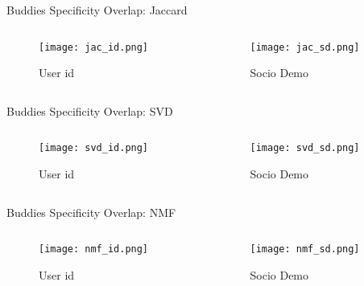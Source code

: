 \documentclass[pdf]{beamer}
\begin{document}
\begin{frame}{Buddies Specificity Overlap: Jaccard}
     \begin{columns}[T] %
     \begin{column}[T]{5cm} %
              \begin{figure}
     \texttt{[image: jac\_id.png]}
     \caption{User id}
              \end{figure}
     \end{column}
          \begin{column}[T]{5cm} %
          \begin{figure}
     \texttt{[image: jac\_sd.png]}
          \caption{Socio Demo}
              \end{figure}
    	\end{column}
     \end{columns}
\end{frame}

\begin{frame}{Buddies Specificity Overlap: SVD}
     \begin{columns}[T] %
     \begin{column}[T]{5cm} %
              \begin{figure}
     \texttt{[image: svd\_id.png]}
     \caption{User id}
              \end{figure}
     \end{column}
          \begin{column}[T]{5cm} %
          \begin{figure}
     \texttt{[image: svd\_sd.png]}
          \caption{Socio Demo}
              \end{figure}
    	\end{column}
     \end{columns}
\end{frame}

\begin{frame}{Buddies Specificity Overlap: NMF}
     \begin{columns}[T] %
     \begin{column}[T]{5cm} %
              \begin{figure}
     \texttt{[image: nmf\_id.png]}
     \caption{User id}
              \end{figure}
     \end{column}
          \begin{column}[T]{5cm} %
          \begin{figure}
     \texttt{[image: nmf\_sd.png]}
          \caption{Socio Demo}
              \end{figure}
    	\end{column}
     \end{columns}
\end{frame}
\end{document}
